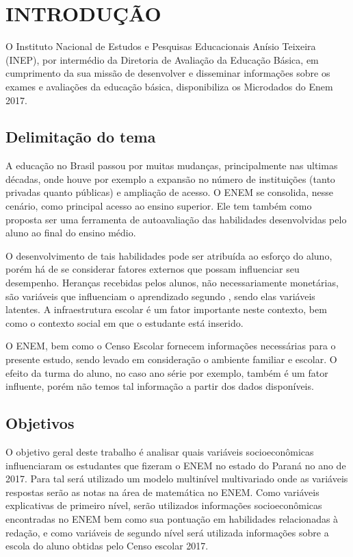\chapter[INTRODUÇÃO]{INTRODUÇÃO}   %

O Instituto Nacional de Estudos e Pesquisas Educacionais Anísio Teixeira (INEP), por intermédio da Diretoria de Avaliação da Educação Básica, em cumprimento da sua missão de desenvolver e disseminar informações sobre os exames e avaliações da educação básica, disponibiliza os Microdados do Enem 2017.

\section{Delimitação do tema}

A educação no Brasil passou por muitas mudanças, principalmente nas ultimas décadas, onde houve por exemplo a expansão no número de instituições (tanto privadas quanto públicas) e ampliação de acesso. O ENEM se consolida, nesse cenário, como principal acesso ao ensino superior. Ele tem também como proposta ser uma ferramenta de autoavaliação das habilidades desenvolvidas pelo aluno ao final do ensino médio. 

O desenvolvimento de tais habilidades pode ser atribuída ao esforço do aluno, porém há de se considerar fatores externos que possam influenciar seu desempenho. Heranças recebidas pelos alunos, não necessariamente monetárias, são variáveis que influenciam o aprendizado segundo \cite{bourdieu1986forms} , sendo elas variáveis latentes. A infraestrutura escolar é um fator importante neste contexto, bem como o contexto social em que o estudante está inserido.

O ENEM, bem como o Censo Escolar fornecem informações necessárias para o presente estudo, sendo levado em consideração o ambiente familiar e escolar. O efeito da turma do aluno, no caso ano série por exemplo, também é um fator influente, porém não temos tal informação a partir dos dados disponíveis.

\section{Objetivos}

O objetivo geral deste trabalho é analisar quais variáveis socioeconômicas influenciaram os estudantes que fizeram o ENEM no estado do Paraná no ano de 2017. Para tal será utilizado um modelo multinível multivariado onde as variáveis respostas serão as notas na área de matemática no ENEM. Como variáveis explicativas de primeiro nível, serão utilizados informações socioeconômicas encontradas no ENEM bem como sua pontuação em habilidades relacionadas à redação, e como variáveis de segundo nível será utilizada informações sobre a escola do aluno obtidas pelo Censo escolar 2017.

